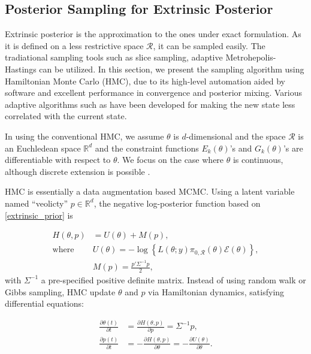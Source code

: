 \documentclass[10pt]{article}
\newcommand{\mc}[1]{\mathcal{#1}}
\begin{document}
\subsection{Posterior Sampling for Extrinsic Posterior}

Extrinsic posterior is the approximation to the ones under exact formulation. As it is defined on a less restrictive space $\mc R$, it can be sampled easily. The tradiational sampling tools such as slice sampling, adaptive Metrohepolis-Hastings can be utilized. In this section, we present the sampling algorithm using Hamiltonian Monte Carlo (HMC), due to its high-level automation aided by software and excellent performance in convergence and posterior mixing. Various adaptive algorithms such as \cite{hoffman2014no} have been developed for making the new state less correlated with the current state.

In using the conventional HMC, we assume $\theta$ is $d$-dimensional and the space $\mc R$ is an Euchledean space $\mathbb R^d$ and the constraint functions $E_k(\theta)$'s and $G_k(\theta)$'s  are differentiable with respect to $\theta$. We focus on the case where $\theta$ is continuous, although discrete extension is possible \citep{zhang2012continuous}.

HMC is essentially a data augmentation based MCMC. Using a latent variable named ``veolicty'' $p\in \mathbb R^d$, the negative log-posterior function based on \eqref{extrinsic_prior} is

\begin{equation}
\begin{aligned}
H(\theta, p)& = U(\theta)+M(p),\\
\text{where } & U(\theta) = -\log\left\{ L(\theta;y)\pi_{0,\mc R}(\theta) \mc{E}(\theta) \right\},\\
& M(p) = \frac{p'\Sigma^{-1} p}{2},\end{aligned}
\end{equation}
with $\Sigma^{-1}$ a pre-specified positive definite matrix. Instead of using random walk or Gibbs sampling, HMC update $\theta$ and $p$ via Hamiltonian dynamics, satisfying differential equations:

\begin{equation}
\begin{aligned}
\label{hamiltonian}
\frac{\partial \theta (t)}{\partial t} & =\frac{\partial H(\theta, p)}{\partial p} = \Sigma^{-1}p,\\
\frac{\partial p(t)}{\partial t}& =-\frac{\partial H(\theta, p)}{\partial \theta} = -\frac{\partial U(\theta)}{\partial \theta}.
\end{aligned}
\end{equation}
\end{document}
